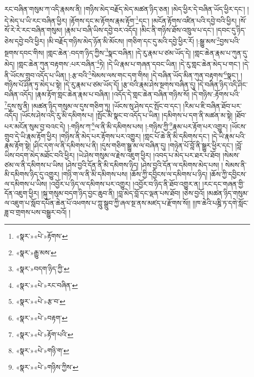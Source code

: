 རང་བཞིན་གསུམ་ཀ་འདི་རྣམས་ནི། །གཉིས་མེད་བརྗོད་མེད་མཚན་ཉིད་ཅན། །མེད་ཕྱིར་དེ་བཞིན་ཡོད་ཕྱིར་དང་། །དེ་མེད་པ་ཡི་རང་བཞིན་ཕྱིར། །རྟོགས་དང་མ་རྟོགས་རྣམ་རྟོག་\footnote{«སྣར་»«པེ་»རྟོགས་}དང་། །མངོན་རྟོགས་འཛིན་པའི་དབྱེ་བའི་ཕྱིར། །སོ་སོ་རེ་རེ་རང་བཞིན་གསུམ། །རྣམ་པ་བཞི་ཡིས་དབྱེ་བར་འདོད། །མིང་ནི་གཉིས་ཐོས་འཁྲུལ་པ་དང་། །དབང་དུ་ཉིད་ཅེས་དབྱེ་བའི་ཕྱིར། །མི་བརྗོད་གཉིས་མེད་ཉོན་མི་མོངས། །གཅིག་དང་དུ་མའི་དབྱེ་ཕྱིར་རོ། །:སྒྱུ་མས་\footnote{«སྣར་»རྒྱུ་མས་}བྱས་པའི་སྔགས་དབང་གིས། །གླང་ཆེན་:བདག་ཉིད་ཀྱིས་\footnote{«སྣར་»བདག་ཉིད་ཀྱི་}སྣང་བཞིན། །དེ་རུ་རྣམ་པ་ཙམ་ཡོད་དེ། །གླང་ཆེན་རྣམ་པ་ཀུན་དུ་མེད། །གླང་ཆེན་ཀུན་བརྟགས་:པར་བཞིན་\footnote{«སྣར་»«པེ་»རང་བཞིན་}ཏེ། །དེ་ཡི་རྣམ་པ་གཞན་དབང་ཡིན། །དེ་རུ་གླང་ཆེན་མེད་པ་གང་། །དེ་ནི་ཡོངས་གྲུབ་འདོད་པ་ཡིན། །:རྩ་བའི་\footnote{«སྣར་»«པེ་»རྩ་བ་}སེམས་ལས་གང་དག་གིས། །དེ་བཞིན་ཡོད་མིན་ཀུན་བརྟགས་\footnote{«སྣར་»«པེ་»བརྟག་}སྣང་། །གཉིས་པོ་ཤིན་ཏུ་མེད་པ་སྟེ། །དེ་རུ་རྣམ་པ་ཙམ་ཡོད་དོ། །རྩ་བའི་རྣམ་ཤེས་སྔགས་བཞིན་དུ། །དེ་བཞིན་ཉིད་འདི་ཤིང་བཞིན་འདོད། །རྣམ་རྟོག་གླང་ཆེན་རྣམ་པ་བཞིན། །འདོད་དེ་གླང་ཆེན་བཞིན་གཉིས་སོ། །དེ་གཉིས་:རྟོགས་པའི་\footnote{«སྣར་»«པེ་»རྟོག་པའི་}དུས་སུ་ནི། །མཚན་ཉིད་གསུམ་ལ་དུས་གཅིག་ཏུ། །ཡོངས་སུ་ཤེས་དང་སྤོང་བ་དང་། །རིམ་པ་ཇི་བཞིན་ཐོབ་པར་འདོད། །ཡོངས་ཤེས་འདི་རུ་མི་དམིགས་པ། །སྤོང་མི་སྣང་བ་འདོད་པ་ཡིན། །དམིགས་པ་དག་ནི་མཚན་མ་སྟེ། །ཐོབ་པར་མངོན་སུམ་བྱ་བའང་དེ། །:གཉིས་ཀ་\footnote{«སྣར་»«པེ་»གཉི་ག་}ལ་ནི་མི་དམིགས་པས། །:གཉིས་ཀྱི་\footnote{«སྣར་»«པེ་»གཉིས་ཀྱིས་}རྣམ་པར་རྟོག་པར་འགྱུར། །ཡོངས་གྲུབ་དེ་ཡི་རྣམ་རྟོག་ཕྱིར། །གཉིས་ནི་མེད་པར་རྟོགས་པར་འགྱུར། །གླང་པོ་ཆེ་ནི་མི་དམིགས་དང་། །དེ་ཡི་རྣམ་པའི་རྣམ་རྟོག་སྟེ། །ཤིང་དག་ལ་ནི་དམིགས་པ་ནི། །དུས་གཅིག་སྒྱུ་མ་ལ་བཞིན་དུ། །གཉེན་པོ་བློ་ནི་སྒྱུར་ཕྱིར་དང་། །བློ་ཡིས་བདག་མེད་མཐོང་བའི་ཕྱིར། །ཡེ་ཤེས་གསུམ་ལ་རྗེས་འཇུག་ཕྱིར། །འབད་པ་མེད་པར་ཐར་པ་ཐོབ། །སེམས་ཙམ་ལ་ནི་དམིགས་པ་ཡིས། །ཤེས་བྱའི་དོན་ནི་མི་དམིགས་ཉིད། །ཤེས་བྱའི་དོན་ལ་དམིགས་མེད་པས། །
སེམས་ནི་མི་དམིགས་ཉིད་དུ་འགྱུར། །གཉི་ག་ལ་ནི་མི་དམིགས་པས། །ཆོས་ཀྱི་དབྱིངས་ལ་དམིགས་པ་ཉིད། །ཆོས་ཀྱི་དབྱིངས་ལ་དམིགས་པ་ཡིས། །འབྱོར་པ་ཉིད་ལ་དམིགས་པར་འགྱུར། །འབྱོར་བ་ཉིད་ནི་ཐོབ་འགྱུར་ན། །རང་དང་གཞན་གྱི་དོན་འཇུག་ཕྱིར། །སྐུ་གསུམ་བདག་ཉིད་བྱང་ཆུབ་ནི། །བླ་མེད་བློ་དང་ལྡན་པས་ཐོབ། །ཅེས་བྱའོ། །མཚན་ཉིད་གསུམ་ལ་འཇུག་པ་སློབ་དཔོན་ཆེན་པོ་འཕགས་པ་ཀླུ་སྒྲུབ་ཀྱི་ཞལ་སྔ་ནས་མཛད་པ་རྫོགས་སོ།། །།ཁ་ཆེའི་པཎྜི་ཏ་དགེ་སློང་ཟླ་བ་གྲགས་པས་བསྒྱུར་བའོ། ། 